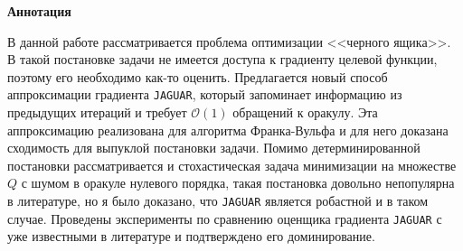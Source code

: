 \begin{center}
    \Large{\textbf{Аннотация}}
\end{center}

    В данной работе рассматривается проблема оптимизации <<черного ящика>>. В такой постановке задачи не имеется доступа к градиенту целевой функции, поэтому его необходимо как-то оценить. Предлагается новый способ аппроксимации градиента \texttt{JAGUAR}, который запоминает информацию из предыдущих итераций и требует $\mathcal{O}(1)$ обращений к оракулу. Эта аппроксимацию реализована для алгоритма Франка-Вульфа и для него доказана сходимость для выпуклой постановки задачи. Помимо детерминированной постановки рассматривается и стохастическая задача минимизации на множестве $Q$ с шумом в оракуле нулевого порядка, такая постановка довольно непопулярна в литературе, но я было доказано, что \texttt{JAGUAR} является робастной и в таком случае. Проведены эксперименты по сравнению оценщика градиента \texttt{JAGUAR} с уже известными в литературе и подтверждено его доминирование.